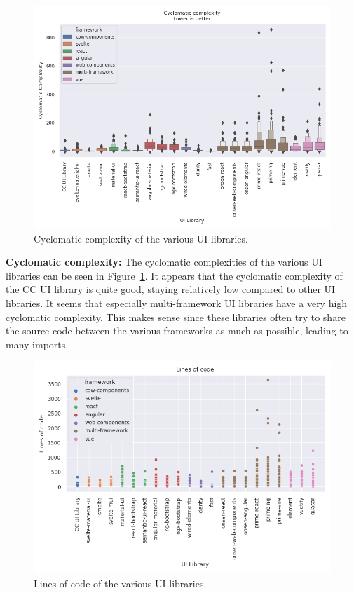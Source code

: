 \begin{figure}[h]
  \includegraphics[width=\columnwidth]{plots/cyclomatic-complexity.png}
  \caption{Cyclomatic complexity of the various UI libraries.}
  \label{fig:results:cyclomatic-complexity}
  \centering
\end{figure}

\textbf{Cyclomatic complexity:} The cyclomatic complexities of the various UI libraries can be seen in Figure~\ref{fig:results:cyclomatic-complexity}. It appears that the cyclomatic complexity of the CC UI library is quite good, staying relatively low compared to other UI libraries. It seems that especially multi-framework UI libraries have a very high cyclomatic complexity. This makes sense since these libraries often try to share the source code between the various frameworks as much as possible, leading to many imports.

\begin{figure}[h]
  \includegraphics[width=\columnwidth]{plots/lines-of-code.png}
  \caption{Lines of code of the various UI libraries.}
  \label{fig:results:lines-of-code}
  \centering
\end{figure}

